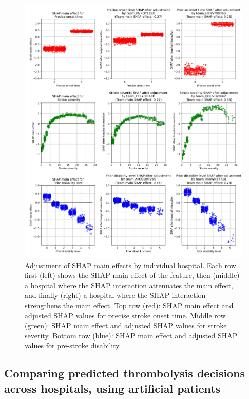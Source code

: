 \begin{figure}[!h]
\centering
\includegraphics[width=1.0\textwidth]{./images/12aa_three_way_shap_adjustment}
\caption{Adjustment of SHAP main effects by individual hospital. Each row first (left) shows the SHAP main effect of the feature, then (middle) a hospital where the SHAP interaction attenuates the main effect, and finally (right) a hospital where the SHAP interaction strengthens the main effect. Top row (red): SHAP main effect and adjusted SHAP values for precise stroke onset time. Middle row (green): SHAP main effect and adjusted SHAP values for stroke severity. Bottom row (blue): SHAP main effect and adjusted SHAP values for pre-stroke disability.}
\label{fig:results_shap_hosp_intercations}
\end{figure}
\fi

\iffalse
\subsection{Comparing predicted thrombolysis decisions across hospitals, using artificial patients}

